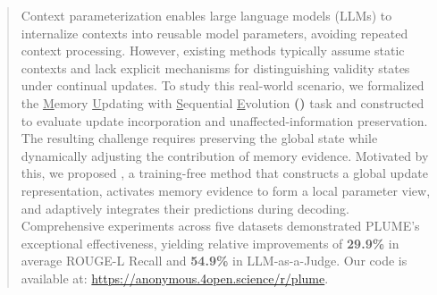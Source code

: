 \begin{abstract}

Context parameterization enables large language models (LLMs) to internalize contexts into reusable model parameters, avoiding repeated context processing.
However, existing methods typically assume static contexts and lack explicit mechanisms for distinguishing validity states under continual updates.
To study this real-world scenario, we formalized the \underline{M}emory \underline{U}pdating with \underline{S}equential \underline{E}volution \textbf{(\task{})} task and constructed \textbf{\benchmark{}} to evaluate update incorporation and unaffected-information preservation.
The resulting challenge requires preserving the global state while dynamically adjusting the contribution of memory evidence.
Motivated by this, we proposed 
\textbf{\method{}}, a training-free method that constructs a global update representation, activates memory evidence to form a local parameter view, and adaptively integrates their predictions during decoding.
Comprehensive experiments across five datasets demonstrated PLUME's exceptional effectiveness, yielding relative improvements of \textbf{29.9\%} in average ROUGE-L Recall and \textbf{54.9\%} in LLM-as-a-Judge.
Our code is available at: \url{https://anonymous.4open.science/r/plume}.

\end{abstract}

